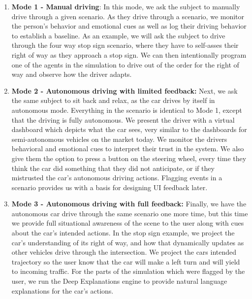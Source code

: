\begin{enumerate}[itemsep=0pt,parsep=0pt,topsep=4pt,leftmargin=0.4in]
    \item \textbf{Mode 1 - Manual driving}: In this mode, we ask the subject to manually drive through a given scenario. 
    As they drive through a scenario, we monitor the person's behavior and emotional cues as well as log their driving behavior to establish a baseline. 
    As an example, we will ask the subject to drive through the four way stop sign scenario, where they have to self-asses their right of way as they approach a stop sign. We can then intentionally program one of the agents in the simulation to drive out of the order for the right of way and observe how the driver adapts. 
    \item \textbf{Mode 2 - Autonomous driving with limited feedback:} Next, we ask the same subject to sit back and relax, as the car drives by itself in autonomous mode. Everything in the scenario is identical to Mode 1, except that the driving is fully autonomous. We present the driver with a virtual dashboard which depicts what the car sees, very similar to the dashboards for semi-autonomous vehicles on the market today.  We monitor the drivers behavioral and emotional cues to interpret their trust in the system. We also give them the option to press a button on the steering wheel, every time they think the car did something that they did not anticipate, or if they mistrusted the car's autonomous driving actions. Flagging events in a scenario provides us with a basis for designing UI feedback later.
    \item \textbf{Mode 3 - Autonomous driving with full feedback:} Finally, we have the autonomous car drive through the same scenario one more time, but this time we provide full situational awareness of the scene to the user along with cues about the car's intended actions. In the stop sign example, we project the car's understanding of its right of way, and how that dynamically updates as other vehicles drive through the intersection. We project the cars intended trajectory so the user know that the car will make a left turn and will yield to incoming traffic. For the parts of the simulation which were flagged by the user, we run the Deep Explanations engine to provide natural language explanations for the car's actions. 
\end{enumerate}
